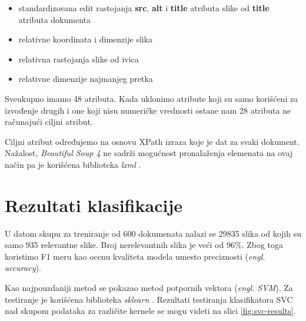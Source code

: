 \documentclass[a4paper]{article}
\begin{document}
\begin{itemize}
	\item standardizovana edit rastojanja \textbf{src}, \textbf{alt} i \textbf{title} atributa slike od \textbf{title} atributa dokumenta
	\item relativne koordinata i dimenzije slika
	\item relativna rastojanja slike od ivica
	\item relativne dimenzije najmanjeg pretka
\end{itemize}
Sveukupno imamo 48 atributa. Kada uklonimo atribute koji su samo korišćeni za izvođenje drugih i one koji nisu numeričke vrednosti ostane nam 28 atributa ne računajući ciljni atribut.

Ciljni atribut određujemo na osnovu XPath izraza koje je dat za svaki dokument. Nažalost, \textit{Beautiful Soup 4} ne sadrži mogućnost pronalaženja elemenata na ovaj način pa je korišćena biblioteka \textit{lxml} \cite{lxml}.

\section{Rezultati klasifikacije}

U datom skupu za treniranje od 600 dokumenata nalazi se 29835 slika od kojih su samo 935 relevantne slike. Broj nerelevantnih slika je veći od 96\%. Zbog toga koristimo F1 meru kao ocenu kvaliteta modela umesto preciznosti (\emph{engl. accuracy}).

Kao najpouzdaniji metod se pokazao metod potpornih vektora (\emph{engl. SVM}). Za testiranje je korišćena biblioteka \textit{sklearn} \cite{sklearn}. Rezultati testiranja klasifikatora SVC nad skupom podataka za različite kernele se mogu videti na slici \ref{fig:svc-results}.

%
\end{document}
